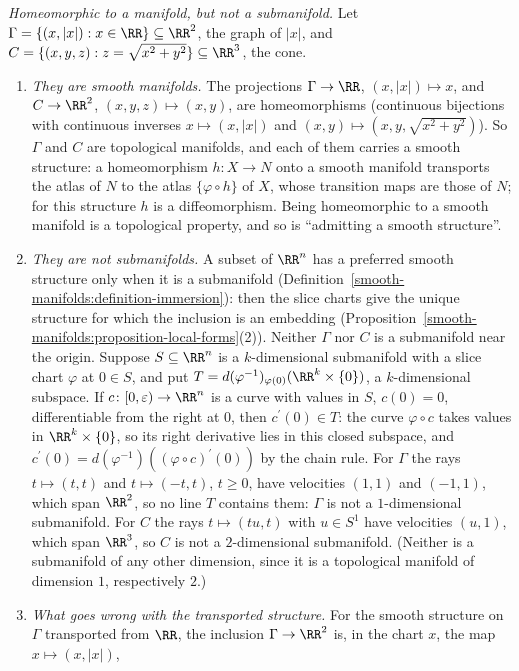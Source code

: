 \begin{example}\label{smooth-manifolds:example-not-submanifold}
\emph{Homeomorphic to a manifold, but not a submanifold.} Let $\Gamma = \{(x, |x|) : x \in \RR\} \subseteq \RR^2$, the graph of $|x|$, and $C = \{(x, y, z) : z = \sqrt{x^2 + y^2}\} \subseteq \RR^3$, the cone.
\begin{enumerate}
\item \emph{They are smooth manifolds.} The projections $\Gamma \to \RR$, $(x, |x|) \mapsto x$, and $C \to \RR^2$, $(x, y, z) \mapsto (x, y)$, are homeomorphisms (continuous bijections with continuous inverses
$x \mapsto (x, |x|)$ and $(x, y) \mapsto (x, y, \sqrt{x^2 + y^2})$). So $\Gamma$ and $C$ are topological manifolds, and each of them carries a smooth structure: a homeomorphism $h \colon X \to N$ onto a
smooth manifold transports the atlas of $N$ to the atlas $\{\varphi \circ h\}$ of $X$, whose transition maps are those of $N$; for this structure $h$ is a diffeomorphism. Being homeomorphic to a smooth
manifold is a topological property, and so is ``admitting a smooth structure''.
\item \emph{They are not submanifolds.} A subset of $\RR^n$ has a preferred smooth structure only when it is a submanifold (Definition~\ref{smooth-manifolds:definition-immersion}): then the slice charts give
the unique structure for which the inclusion is an embedding (Proposition~\ref{smooth-manifolds:proposition-local-forms}(2)). Neither $\Gamma$ nor $C$ is a submanifold near the origin. Suppose $S \subseteq \RR^n$ is a
$k$-dimensional submanifold with a slice chart $\varphi$ at $0 \in S$, and put $T = d(\varphi^{-1})_{\varphi(0)}(\RR^k \times \{0\})$, a $k$-dimensional subspace. If $c \colon [0, \varepsilon) \to \RR^n$ is a curve
with values in $S$, $c(0) = 0$, differentiable from the right at $0$, then $c^{\prime}(0) \in T$: the curve $\varphi \circ c$ takes values in $\RR^k \times \{0\}$, so its right derivative lies in this closed
subspace, and $c^{\prime}(0) = d(\varphi^{-1})((\varphi \circ c)^{\prime}(0))$ by the chain rule. For $\Gamma$ the rays $t \mapsto (t, t)$ and $t \mapsto (-t, t)$, $t \geq 0$, have velocities $(1, 1)$ and
$(-1, 1)$, which span $\RR^2$, so no line $T$ contains them: $\Gamma$ is not a $1$-dimensional submanifold. For $C$ the rays $t \mapsto (tu, t)$ with $u \in S^1$ have velocities $(u, 1)$, which span
$\RR^3$, so $C$ is not a $2$-dimensional submanifold. (Neither is a submanifold of any other dimension, since it is a topological manifold of dimension $1$, respectively $2$.)
\item \emph{What goes wrong with the transported structure.} For the smooth structure on $\Gamma$ transported from $\RR$, the inclusion $\Gamma \to \RR^2$ is, in the chart $x$, the map $x \mapsto (x, |x|)$,

\end{enumerate}
\end{example}

